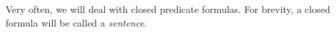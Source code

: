 

\setcounter{section}{3}
\setcounter{subsection}{1}
\setcounter{dfn}{0}

Very often, we will deal with closed predicate formulas.
For brevity, a closed formula will be called a \emph{sentence}.



